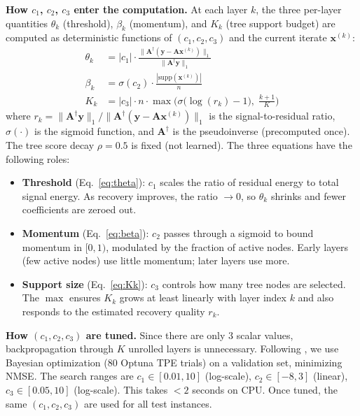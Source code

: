 \documentclass{article}
\begin{document}
\textbf{How $c_1$, $c_2$, $c_3$ enter the computation.} At each layer $k$, the three per-layer quantities $\theta_k$ (threshold), $\beta_k$ (momentum), and $K_k$ (tree support budget) are computed as deterministic functions of $(c_1, c_2, c_3)$ and the current iterate $\mathbf{x}^{(k)}$:
\begin{align}
    \theta_k &= |c_1| \cdot \frac{\|\mathbf{A}^\dagger(\mathbf{y} - \mathbf{A}\mathbf{x}^{(k)})\|_1}{\|\mathbf{A}^\dagger \mathbf{y}\|_1} \label{eq:theta}\\[6pt]
    \beta_k &= \sigma(c_2) \cdot \frac{|\mathrm{supp}(\mathbf{x}^{(k)})|}{n} \label{eq:beta}\\[6pt]
    K_k &= |c_3| \cdot n \cdot \max\!\Big(\sigma\!\big(\log(r_k) - 1\big),\;\tfrac{k+1}{K}\Big) \label{eq:Kk}
\end{align}
where $r_k = \|\mathbf{A}^\dagger \mathbf{y}\|_1 \big/ \|\mathbf{A}^\dagger(\mathbf{y} - \mathbf{A}\mathbf{x}^{(k)})\|_1$ is the signal-to-residual ratio, $\sigma(\cdot)$ is the sigmoid function, and $\mathbf{A}^\dagger$ is the pseudoinverse (precomputed once). The tree score decay $\rho = 0.5$ is fixed (not learned). The three equations have the following roles:
\begin{itemize}
\item \textbf{Threshold} (Eq.~\ref{eq:theta}): $c_1$ scales the ratio of residual energy to total signal energy. As recovery improves, the ratio $\to 0$, so $\theta_k$ shrinks and fewer coefficients are zeroed out.
\item \textbf{Momentum} (Eq.~\ref{eq:beta}): $c_2$ passes through a sigmoid to bound momentum in $[0,1)$, modulated by the fraction of active nodes. Early layers (few active nodes) use little momentum; later layers use more.
\item \textbf{Support size} (Eq.~\ref{eq:Kk}): $c_3$ controls how many tree nodes are selected. The $\max$ ensures $K_k$ grows at least linearly with layer index $k$ and also responds to the estimated recovery quality $r_k$.
\end{itemize}

\textbf{How $(c_1, c_2, c_3)$ are tuned.} Since there are only 3 scalar values, backpropagation through $K$ unrolled layers is unnecessary. Following \cite{chen2021hyperlista}, we use Bayesian optimization (80 Optuna TPE trials) on a validation set, minimizing NMSE. The search ranges are $c_1 \in [0.01, 10]$ (log-scale), $c_2 \in [-8, 3]$ (linear), $c_3 \in [0.05, 10]$ (log-scale). This takes $<2$ seconds on CPU. Once tuned, the same $(c_1, c_2, c_3)$ are used for all test instances.
\end{document}
